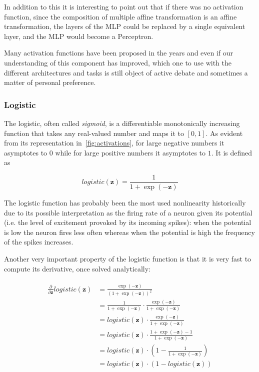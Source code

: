 In addition to this it is interesting to point out that if there was no
activation function, since the composition of multiple affine transformation
is an affine transformation, the layers of the MLP could be replaced by a
single equivalent layer, and the MLP would become a Perceptron.

Many activation functions have been proposed in the years and even if our
understanding of this component has improved, which one to use with the
different architectures and tasks is still object of active debate and
sometimes a matter of personal preference.

\subsubsection{Logistic}\label{sec:logistic}
The logistic, often called \emph{sigmoid}, is a differentiable monotonically
increasing function that takes any real-valued number and maps it to $[0, 1]$.
As evident from its representation in~\autoref{fig:activations}, for large
negative numbers it asymptotes to $0$ while for large positive numbers it
asymptotes to $1$. It is defined as

\begin{equation}\label{eq:logistic}
    logistic(\mathbf{z}) = \frac{1}{1+\exp(-\mathbf{z})}
\end{equation}

\noindent The logistic function has probably been the most used nonlinearity
historically due to its possible interpretation as the firing rate of a neuron
given its potential (i.e. the level of excitement provoked by its incoming
spikes): when the potential is low the neuron fires less often whereas when the
potential is high the frequency of the spikes increases.

Another very important property of the logistic function is that it is very
fast to compute its derivative, once solved analytically:

\begin{align}\label{eq:logistic_derivative}
\begin{split}%
    \frac{\partial}{\partial \mathbf{z}}logistic(\mathbf{z}) &=
        \frac{\exp(\mathbf{-z})}{\left(1+\exp(-\mathbf{z})\right)^2} \\
    &= \frac{1}{1+\exp(-\mathbf{z})} \cdot
        \frac{\exp(-\mathbf{z})}{1+\exp(-\mathbf{z})} \\
    &= logistic(\mathbf{z}) \cdot
        \frac{\exp(-\mathbf{z})}{1+\exp(-\mathbf{z})} \\
    &= logistic(\mathbf{z}) \cdot
        \frac{1+\exp(-\mathbf{z})-1}{1+\exp(-\mathbf{z})} \\
    &= logistic(\mathbf{z}) \cdot
        \left(1-\frac{1}{1+\exp(-\mathbf{z})}\right) \\
    &= logistic(\mathbf{z}) \cdot (1-logistic(\mathbf{z}))
\end{split}
\end{align}

